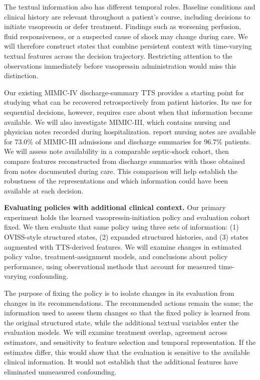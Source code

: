 The textual information also has different temporal roles.
Baseline conditions and clinical history are relevant throughout a patient's course, including decisions to initiate vasopressin or defer treatment.
Findings such as worsening perfusion, fluid responsiveness, or a suspected cause of shock may change during care.
We will therefore construct states that combine persistent context with time-varying textual features across the decision trajectory.
Restricting attention to the observations immediately before vasopressin administration would miss this distinction.

Our existing MIMIC-IV discharge-summary TTS provides a starting point for studying what can be recovered retrospectively from patient histories.
Its use for sequential decisions, however, requires care about when that information became available.
We will also investigate MIMIC-III, which contains nursing and physician notes recorded during hospitalization.
\citet{hsu2020characterizing} report nursing notes are available for 73.0\% of MIMIC-III admissions and discharge summaries for 96.7\% patients.
We will assess note availability in a comparable septic-shock cohort, then compare features reconstructed from discharge summaries with those obtained from notes documented during care.
This comparison will help establish the robustness of the representations and which information could have been available at each decision.

\textbf{Evaluating policies with additional clinical context.}
Our primary experiment holds the learned vasopressin-initiation policy and evaluation cohort fixed.
We then evaluate that same policy using three sets of information: (1) OVISS-style structured states, (2) expanded structured histories, and (3) states augmented with TTS-derived features.
We will examine changes in estimated policy value, treatment-assignment models, and conclusions about policy performance, using observational methods that account for measured time-varying confounding.

The purpose of fixing the policy is to isolate changes in its evaluation from changes in its recommendations.
The recommended actions remain the same; the information used to assess them changes so that the fixed policy is learned from the original structured state, while the additional textual variables enter the evaluation models.
We will examine treatment overlap, agreement across estimators, and sensitivity to feature selection and temporal representation.
If the estimates differ, this would show that the evaluation is sensitive to the available clinical information.
It would not establish that the additional features have eliminated unmeasured confounding.

